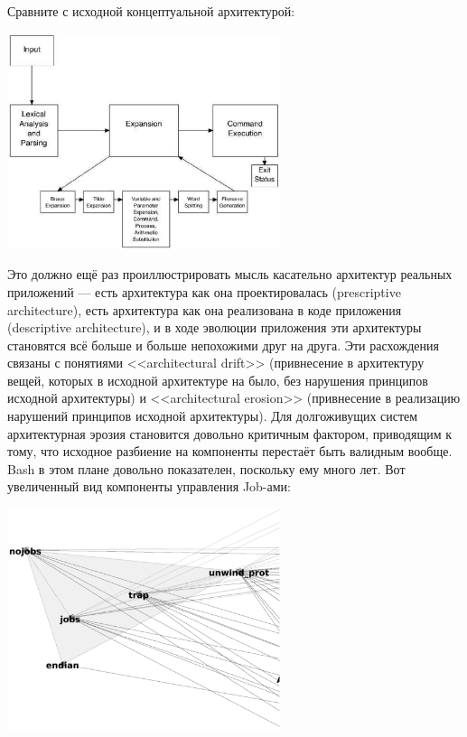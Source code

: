 \documentclass{../text-style}
\begin{document}
Сравните с исходной концептуальной архитектурой:

\begin{center}
    \includegraphics[width=0.6\textwidth]{bashArchitecture.png}
\end{center}

Это должно ещё раз проиллюстрировать мысль касательно архитектур реальных приложений --- есть архитектура как она проектировалась (prescriptive architecture), есть архитектура как она реализована в коде приложения (descriptive architecture), и в ходе эволюции приложения эти архитектуры становятся всё больше и больше непохожими друг на друга. Эти расхождения связаны с понятиями <<architectural drift>> (привнесение в архитектуру вещей, которых в исходной архитектуре на было, без нарушения принципов исходной архитектуры) и <<architectural erosion>> (привнесение в реализацию нарушений принципов исходной архитектуры). Для долгоживущих систем архитектурная эрозия становится довольно критичным фактором, приводящим к тому, что исходное разбиение на компоненты перестаёт быть валидным вообще. Bash в этом плане довольно показателен, поскольку ему много лет. Вот увеличенный вид компоненты управления Job-ами:

\begin{center}
    \includegraphics[width=0.6\textwidth]{bashJobControl.png}
\end{center}
\end{document}
